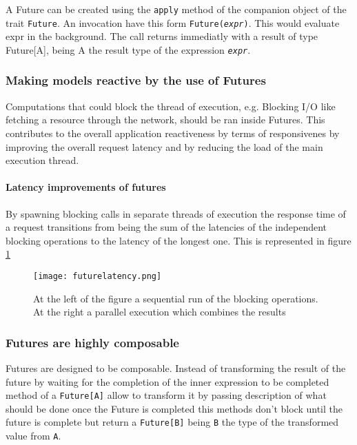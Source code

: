 \documentclass[../main.tex]{subfiles}
\begin{document}
A Future can be created using the \texttt{apply} method of the companion object
of the trait \texttt{Future}. An invocation have this form
\texttt{Future(\textit{expr})}. This would evaluate expr in the background. The
call returns immediatly with a result of type Future[A], being A the result type
of the expression \texttt{\textit{expr}}.

\subsubsection{Making models reactive by the use of Futures}

Computations that could block the thread of execution, e.g. Blocking I/O like
fetching a resource through the network, should be ran inside Futures. This
contributes to the overall application reactiveness by terms of responsivenes by
improving the overall request latency and by reducing the load of the main
execution thread.

\paragraph{Latency improvements of futures}

By spawning blocking calls in separate threads of execution the response time of
a request transitions from being the sum of the latencies of the independent
blocking operations to the latency of the longest one. This is represented in
figure \ref{fig:futurelatency}

\begin{figure}[ht]
  \centering
  \texttt{[image: futurelatency.png]}
  \caption{\label{fig:futurelatency}
    At the left of the figure a sequential run of the blocking operations. At
    the right a parallel execution which combines the results
  }
\end{figure}

\subsubsection{Futures are highly composable}
Futures are designed to be composable. Instead of transforming the result of the
future by waiting for the completion of the inner expression to be completed
method of a \texttt{Future[A]} allow to transform it by passing description of what
should be done once the Future is completed this methods don't block until the
future is complete but return a \texttt{Future[B]} being \texttt{B} the type of the transformed
value from \texttt{A}.
\end{document}
